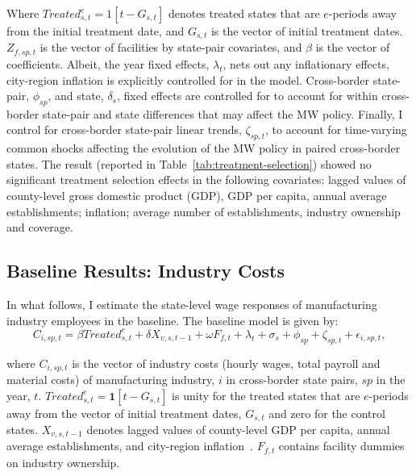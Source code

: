 \documentclass{C:/Users/david/OneDrive/Documents/ULMS/PhD/Thesis/chapter3/src/climate_change/latex/Economic_Journal/OUP-EJ}
\begin{document}
    Where $Treated_{s,t}^e = 1[t - G_{s,t}]$ denotes treated states that are $e$-periods away from the initial treatment date, and $G_{s,t}$ is the vector of initial treatment dates. $Z_{f,sp,t}$ is the vector of facilities by state-pair covariates, and $\beta$ is the vector of coefficients. Albeit, the year fixed effects, $\lambda_{t}$, nets out any inflationary effects, city-region inflation is explicitly controlled for in the model. Cross-border state-pair, $\phi_{sp}$, and state, $\delta_{s}$, fixed effects are controlled for to account for within cross-border state-pair and state differences that may affect the MW policy. Finally, I control for cross-border state-pair linear trends, $\zeta_{sp,t}$, to account for time-varying common shocks affecting the evolution of the MW policy in paired cross-border states. The result (reported in Table~\ref{tab:treatment-selection}) showed no significant treatment selection effects in the following covariates: lagged values of county-level gross domestic product (GDP), GDP per capita, annual average establishments; inflation; average number of establishments, industry ownership and coverage.
    

    \subsection{Baseline Results: Industry Costs}\label{subsec:baseline-results-industry-costs}
    In what follows, I estimate the state-level wage responses of manufacturing industry employees in the baseline. The baseline model is given by:
    \begin{equation}
        C_{i,sp,t} = \beta Treated_{s,t}^e + \delta X_{v,s,t-1} + \omega F_{f,t} + \lambda_{t} + \sigma_{s} + \phi_{sp} + \zeta_{sp,t} + \epsilon_{i,sp,t},\label{eq:baseline-wages}
    \end{equation}

    where $C_{i,sp,t}$ is the vector of industry costs (hourly wages, total payroll and material costs) of manufacturing industry, $i$ in cross-border state pairs, $sp$ in the year, $t$. $Treated_{s,t}^e = \textbf{1}[t - G_{s,t}]$ is unity for the treated states that are $e$-periods away from the vector of initial treatment dates, $G_{s,t}$ and zero for the control states. $X_{v,s,t-1}$ denotes lagged values of county-level GDP per capita, annual average establishments, and city-region inflation~\citep{gopalan2021state, dube2010minimum, clemens2019making}. $F_{f,t}$ contains facility dummies on industry ownership.
\end{document}
